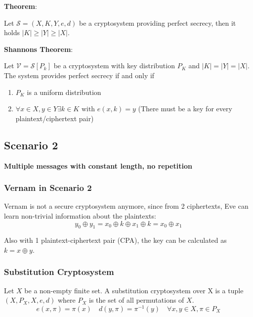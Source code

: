 \textbf{Theorem}:

Let \(\mathcal{S} = (X,K,Y,e,d)\) be a cryptosystem providing perfect
secrecy, then it holds \(|K| \geq |Y| \geq |X|\).

\textbf{Shannons Theorem}:

Let \(\mathcal{V} = \mathcal{S}[P_k]\) be a cryptosystem with key
distribution \(P_K\) and \(|K| = |Y| = |X|\). The system provides
perfect secrecy if and only if

\begin{enumerate}
\def\labelenumi{\arabic{enumi}.}
\tightlist
\item
  \(P_K\) is a uniform distribution
\item
  \(\forall x \in X, y \in Y \exists k \in K \text{ with } e(x, k) = y\)
  (There must be a key for every plaintext/ciphertext pair)
\end{enumerate}

\hypertarget{scenario-2}{%
\subsection{Scenario 2}\label{scenario-2}}

\textbf{Multiple messages with constant length, no repetition}

\hypertarget{vernam-in-scenario-2}{%
\subsubsection{Vernam in Scenario 2}\label{vernam-in-scenario-2}}

Vernam is not a secure cryptosystem anymore, since from 2 ciphertexts,
Eve can learn non-trivial information about the plaintexts:
\[y_0 \oplus y_1 = x_0 \oplus k \oplus x_1 \oplus k = x_0 \oplus x_1\]

Also with 1 plaintext-ciphertext pair (CPA), the key can be calculated
as \(k = x \oplus y\).

\hypertarget{substitution-cryptosystem}{%
\subsubsection{Substitution
Cryptosystem}\label{substitution-cryptosystem}}

Let \(X\) be a non-empty finite set. A substitution cryptosystem over X
is a tuple \((X, P_X, X, e, d)\) where \(P_X\) is the set of all
permutations of \(X\).
\[e(x, \pi) = \pi(x) \quad d(y, \pi) = \pi^{-1}(y) \quad \forall x,y \in X, \pi \in P_X\]

